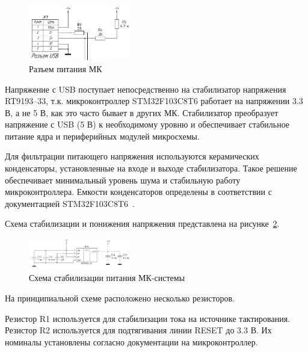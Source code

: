 \begin{figure}[H]
    \centering
    \includegraphics[width=0.4\textwidth]{images/design/usb}
    \caption{\centering Разъем питания МК}
    \label{fig:usb}
\end{figure}

Напряжение с USB поступает непосредственно на стабилизатор напряжения RT9193--33, т.к. микроконтроллер STM32F103C8T6 работает на напряжении 3.3 В, а не 5 В, как это часто бывает в других МК.
Стабилизатор преобразует напряжение с USB (5 В) к необходимому уровню и обеспечивает стабильное питание ядра и периферийных модулей микросхемы.

Для фильтрации питающего напряжения используются керамических конденсаторы, установленные на входе и выходе стабилизатора.
Такое решение обеспечивает минимальный уровень шума и стабильную работу микроконтроллера.
Емкости конденсаторов определены в соответствии с документацией STM32F103C8T6~\cite{stm32f103_datasheet}.

Схема стабилизации и понижения напряжения представлена на рисунке~\ref{fig:mk_usb_stab}.

\begin{figure}[H]
    \centering
    \includegraphics[width=0.4\textwidth]{images/design/mk_usb_stab}
    \caption{\centering Схема стабилизации питания МК-системы}
    \label{fig:mk_usb_stab}
\end{figure}


На принципиальной схеме расположено несколько резисторов.

Резистор R1 используется для стабилизации тока на источнике тактирования.
Резистор R2 используется для подтягивания линии RESET до 3.3 В.
Их номиналы установлены согласно документации на микроконтроллер\cite{stm32f103_datasheet}.

